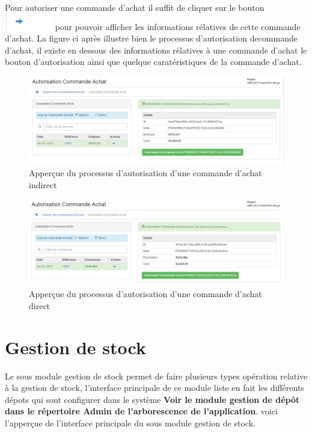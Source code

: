 \documentclass[12pt,a4paper]{report}
\begin{document}
Pour autoriser une commande d'achat il suffit de cliquer sur le bouton \includegraphics[scale=0.7]{pic/BlueArrow.png} pour pouvoir afficher les informations rélatives de cette commande d'achat. La figure ci après illustre bien le processus d'autorisation decommande d'achat, il existe en dessous des informations rélatives à une commande d'achat le bouton d'autorisation ainsi que quelque caratéristiques de la commande d'achat.

\begin{figure}[h]
\begin{center}
\includegraphics[width=12cm]{pic/AutorIndirect.png}
\end{center}
\caption{Apperçue du processus d'autorisation d'une commande d'achat indirect}
\label{Apperçue du processus d'autorisation d'une commande d'achat indirect}
\end{figure} 

\begin{figure}[h]
\begin{center}
\includegraphics[width=12cm]{pic/AutorDirect.png}
\end{center}
\caption{Apperçue du processus d'autorisation d'une commande d'achat direct}
\label{Apperçue du processus d'autorisation d'une commande d'achat direct}
\end{figure} 

\newpage
\section{Gestion de stock}
Le sous module gestion de stock permet de faire plusieurs types opération relative à la gestion de stock, l'interface principale de ce module liste en fait les différents dépots qui sont configurer dans le système \textbf{Voir le module gestion de dépôt dans le répertoire Admin de l'arborescence de l'application}. voici l'apperçue de l'interface principale du sous module gestion de stock.
\end{document}
